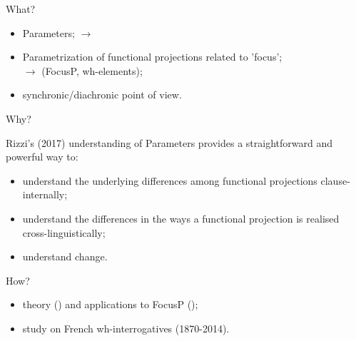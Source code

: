 \documentclass[lesson_slides]{subfiles}
\begin{document}
\begin{frame}[c]{What?}

    \begin{itemize}
        \item[\ding{227}] Parameters; \pause $\longrightarrow$ \cite{rizzi2017} \pause
        \item[\ding{227}] Parametrization of functional projections related to 'focus';\\ \pause
        $\longrightarrow$ (FocusP, wh-elements); \pause
        \item[\ding{227}] synchronic/diachronic point of view.
    \end{itemize}
    
\end{frame}
\begin{frame}[c]{Why?}

    Rizzi's (2017) understanding of Parameters provides a straightforward and powerful way to:
    \begin{itemize}
        \item[\ding{227}] understand the underlying differences among functional projections clause-internally; \pause 
        \item[\ding{227}] understand the differences in the ways a functional projection is realised cross-linguistically;
        \item[\ding{227}] understand change.
    \end{itemize}
  
\end{frame}
\begin{frame}[c]{How?}

    \begin{itemize}
        \item[\ding{227}] theory (\cite{rizzi1997fine}) and applications to FocusP (\cite{samo2019cartography}); \pause 
        \item[\ding{227}] study on French wh-interrogatives \pause (1870-2014).
    \end{itemize}
\end{frame}
\end{document}
